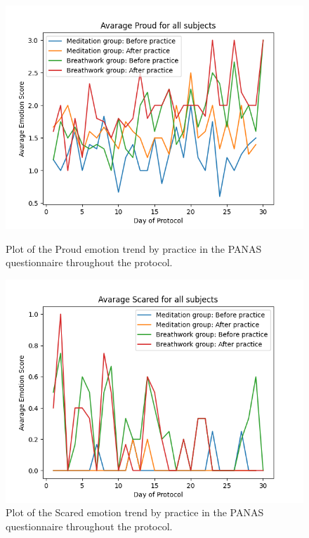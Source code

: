 \begin{figure}
    \centering
    \begin{minipage}{0.49\linewidth}
        \includegraphics[width=\linewidth]{Figures/panas/emotions/Proud.png}
        \caption{Plot of the Proud emotion trend by practice in the PANAS questionnaire throughout the protocol.}
        \label{fig:proud_by_practice}
    \end{minipage}
    \hfill %
    \begin{minipage}{0.49\linewidth}
        \includegraphics[width=\linewidth]{Figures/panas/emotions/Scared.png}
        \caption{Plot of the Scared emotion trend by practice in the PANAS questionnaire throughout the protocol.}
        \label{fig:scared_by_practice}
    \end{minipage}
\end{figure} %

